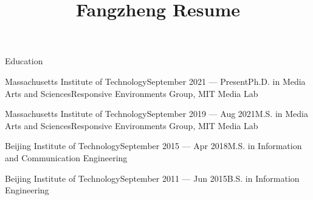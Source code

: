 \documentclass{resume} %
\begin{document}
\title{Fangzheng Resume}

\begin{rSection}{Education}

\begin{rSubsection}{Massachusetts Institute of Technology}{September 2021 --- Present}{Ph.D. in Media Arts and Sciences}{Responsive Environments Group, MIT Media Lab}
\vspace{-.65cm}
\item[]
\end{rSubsection}

\begin{rSubsection}{Massachusetts Institute of Technology}{September 2019 --- Aug 2021}{M.S. in Media Arts and Sciences}{Responsive Environments Group, MIT Media Lab}
\vspace{-.65cm}
\item[]
\end{rSubsection}

\begin{rSubsection}{Beijing Institute of Technology}{September 2015 --- Apr 2018}{M.S. in Information and Communication Engineering}{}
\vspace{-.65cm}
\item[]
\end{rSubsection}

\begin{rSubsection}{Beijing Institute of Technology}{September 2011 --- Jun 2015}{B.S. in Information Engineering}{}
\vspace{-.65cm}
\item[]
\end{rSubsection}

\end{rSection}
\end{document}
